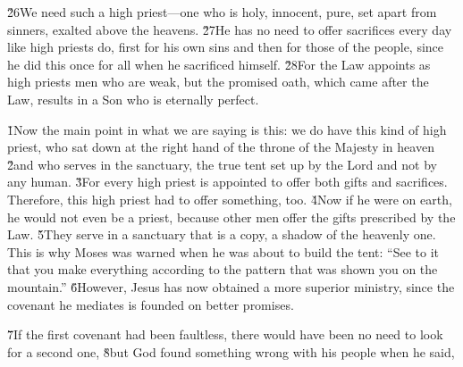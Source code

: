 \v{26}We need such a high priest---one who is holy, innocent, pure, set apart from sinners, exalted above the heavens. \v{27}He has no need to offer sacrifices every day like high priests do, first for his own sins and then for those of the people, since he did this once for all when he sacrificed himself. \v{28}For the Law appoints as high priests men who are weak, but the promised oath, which came after the Law, results in a Son who is eternally perfect.

\v{1}Now the main point in what we are saying is this: we do have this kind of high priest, who sat down at the right hand of the throne of the Majesty in heaven \v{2}and who serves in the sanctuary, the true tent set up by the Lord and not by any human. \v{3}For every high priest is appointed to offer both gifts and sacrifices. Therefore, this high priest had to offer something, too. \v{4}Now if he were on earth, he would not even be a priest, because other men offer the gifts prescribed by the Law. \v{5}They serve in a sanctuary that is a copy, a shadow of the heavenly one. This is why Moses was warned when he was about to build the tent: ``See to it that you make everything according to the pattern that was shown you on the mountain.'' \v{6}However, Jesus has now obtained a more superior ministry, since the covenant he mediates is founded on better promises.

\v{7}If the first covenant had been faultless, there would have been no need to look for a second one, \v{8}but God found something wrong with his people when he said,

